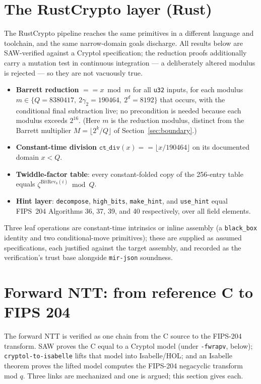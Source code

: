 \documentclass[11pt]{article}
\newcommand{\code}[1]{\texttt{#1}}
\begin{document}
\section{The RustCrypto layer (Rust)}\label{sec:rust}

The RustCrypto pipeline reaches the same primitives in a different language and toolchain, and the same
narrow-domain goals discharge. All results below are SAW-verified against a Cryptol specification; the
reduction proofs additionally carry a mutation test in continuous integration --- a deliberately altered
modulus is rejected --- so they are not vacuously true.
\begin{itemize}
  \item \textbf{Barrett reduction} $== x \bmod m$ for all \code{u32} inputs, for each modulus
  $m \in \{Q = 8380417,\ 2\gamma_2 = 190464,\ 2^d = 8192\}$ that occurs, with the conditional final
  subtraction live; no precondition is needed because each modulus exceeds $2^{16}$. (Here $m$ is the
  reduction modulus, distinct from the Barrett multiplier $M = \lfloor 2^k/Q \rfloor$ of
  Section~\ref{sec:boundary}.)
  \item \textbf{Constant-time division} $\code{ct\_div}(x) == \lfloor x / 190464 \rfloor$ on its
  documented domain $x < Q$.
  \item \textbf{Twiddle-factor table}: every constant-folded copy of the 256-entry table equals
  $\zeta^{\mathrm{BitRev}_8(i)} \bmod Q$.
  \item \textbf{Hint layer}: \code{decompose}, \code{high\_bits}, \code{make\_hint}, and
  \code{use\_hint} equal FIPS~204 Algorithms 36, 37, 39, and 40 respectively, over all field elements.
\end{itemize}
Three leaf operations are constant-time intrinsics or inline assembly (a \code{black\_box} identity and
two conditional-move primitives); these are supplied as assumed specifications, each justified against
the target assembly, and recorded as the verification's trust base alongside \code{mir-json} soundness.

\section{Forward NTT: from reference C to FIPS 204}\label{sec:fwdntt}\label{sec:ntt}

The forward NTT is verified as one chain from the C source to the FIPS-204 transform. SAW proves the C
equal to a Cryptol model (under \code{-fwrapv}, below); \code{cryptol-to-isabelle} lifts that model into
Isabelle/HOL; and an Isabelle theorem proves the lifted model computes the FIPS-204 negacyclic transform
mod $q$. Three links are mechanized and one is argued; this section gives each.
\end{document}
